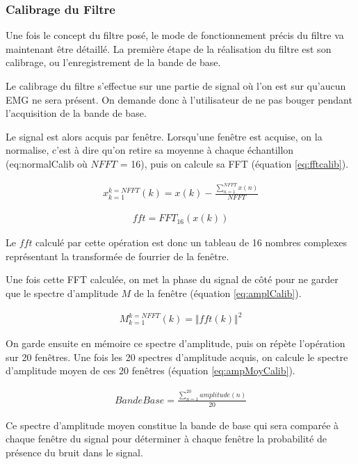 \documentclass[letterpaper, twoside, 12pt, memoire, creativecommons, hyperref]{thETS}
\begin{document}
\subsubsection{Calibrage du Filtre}

Une fois le concept du filtre posé, le mode de fonctionnement précis du filtre va maintenant être détaillé. La première étape de la réalisation du filtre est son calibrage, ou l'enregistrement de la bande de base. 

Le calibrage du filtre s'effectue sur une partie de signal où l'on est sur qu'aucun EMG ne sera présent. On demande donc à l'utilisateur de ne pas bouger pendant l'acquisition de la bande de base. 

Le signal est alors acquis par fenêtre. Lorsqu'une fenêtre est acquise, on la normalise, c'est à dire qu'on retire sa moyenne à chaque échantillon (eq:normalCalib où $NFFT$ = 16), puis on calcule sa FFT (équation \ref{eq:fftcalib}).

\begin{align}\label{eq:normalCalib}
   x_{k=1}^{k=NFFT}(k) = x(k) - \frac{\sum_{n=1}^{NFFT}x(n)}{NFFT}
\end{align}

\begin{align}\label{eq:fftcalib}
   fft = FFT_{16}(x(k)) 
\end{align}

Le $fft$ calculé par cette opération est donc un tableau de 16 nombres complexes représentant la transformée de fourrier de la fenêtre.

Une fois cette FFT calculée, on met la phase du signal de côté pour ne garder que le spectre d'amplitude $M$ de la fenêtre (équation \ref{eq:amplCalib}).

\begin{align}\label{eq:amplCalib}
   M_{k=1}^{k=NFFT}(k) = \Vert fft(k) \Vert^2 
\end{align}

On garde ensuite en mémoire ce spectre d'amplitude, puis on répète l'opération sur 20 fenêtres. Une fois les 20 spectres d'amplitude acquis, on calcule le spectre d'amplitude moyen de ces 20 fenêtres (équation \ref{eq:ampMoyCalib}).

\begin{align}\label{eq:ampMoyCalib}
   BandeBase = \frac{\sum_{n=1}^{20}amplitude(n)}{20}
\end{align}

Ce spectre d'amplitude moyen constitue la bande de base qui sera comparée à chaque fenêtre du signal pour déterminer à chaque fenêtre la probabilité de présence du bruit dans le signal.
\end{document}
